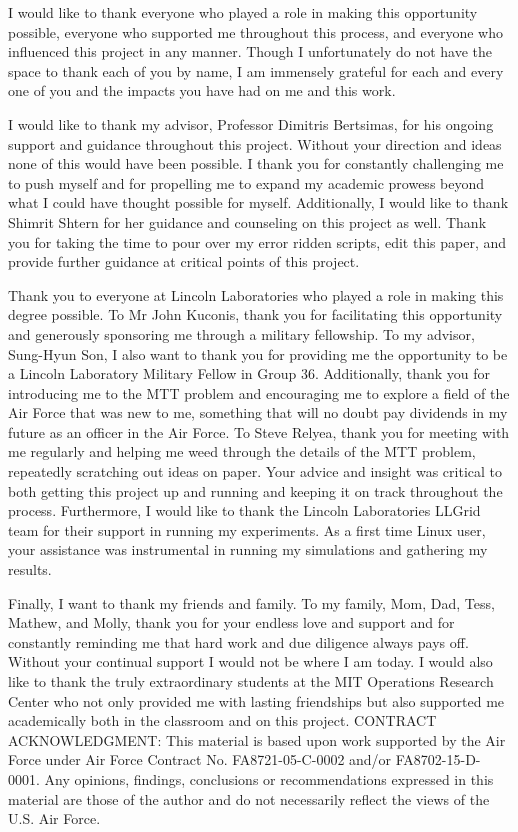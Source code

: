 I would like to thank everyone who played a role in making this opportunity possible, everyone who supported me throughout this process, and everyone who influenced this project in any manner. Though I unfortunately do not have the space to thank each of you by name, I am immensely grateful for each and every one of you and the impacts you have had on me and this work. 

I would like to thank my advisor, Professor Dimitris Bertsimas, for his ongoing support and
guidance throughout this project. Without your direction and ideas none of this would have been possible. I thank you for constantly challenging me to push myself and for propelling me to expand my academic prowess beyond what I could have thought possible for myself. Additionally, I would like to thank Shimrit Shtern for her guidance and counseling on this project as well. Thank you for taking the time to pour over my error ridden scripts, edit this paper, and provide further guidance at critical points of this project. 

Thank you to everyone at Lincoln Laboratories who played a role in making this degree possible. To Mr John Kuconis, thank you for facilitating this opportunity and generously sponsoring me through a military fellowship. To my advisor, Sung-Hyun Son, I also want to thank you for providing me the opportunity to be a Lincoln Laboratory Military Fellow in Group 36. Additionally, thank you for introducing me to the MTT problem and encouraging me to explore a field of the Air Force that was new to me, something that will no doubt pay dividends in my future as an officer in the Air Force. To Steve Relyea, thank you for meeting with me regularly and helping me weed through the details of the MTT problem, repeatedly scratching out ideas on paper. Your advice and insight was critical to both getting this project up and running and keeping it on track throughout the process. Furthermore, I would like to thank the Lincoln Laboratories LLGrid team for their support in running my experiments. As a first time Linux user, your assistance was instrumental in running my simulations and gathering my results.

Finally, I want to thank my friends and family. To my family, Mom, Dad, Tess, Mathew, and Molly, thank you for your endless love and support and for constantly reminding me that hard work and due diligence always pays off. Without your continual support I would not be where I am today. I would also like to thank the truly extraordinary students at the MIT Operations Research Center who not only provided me with lasting friendships but also supported me academically both in the classroom and on this project. 
\vfill
CONTRACT ACKNOWLEDGMENT: This material is based upon work supported by the Air Force under Air Force Contract No. FA8721-05-C-0002 and/or FA8702-15-D-0001. Any opinions, findings, conclusions or recommendations expressed in this material are those of the author and do not necessarily reflect the views of the U.S. Air Force. 
